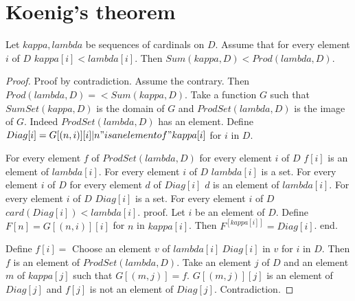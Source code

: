 \documentclass{article}
\begin{document}
  \section*{Koenig's theorem}

  \begin{forthel}
    \begin{theorem}[Koenig]
      Let $kappa, lambda$ be sequences of cardinals on $D$. Assume that for every element $i$ of $D$ $kappa[i] < lambda[i]$. Then $Sum(kappa,D) < Prod(lambda,D)$.
    \end{theorem}
    \begin{proof}
      Proof by contradiction. Assume the contrary. Then $Prod(lambda,D) =<
      Sum(kappa,D)$. Take a function $G$ such that $SumSet(kappa,D)$ is the domain of $G$ and $ProdSet(lambda,D)$ is the image of $G$. Indeed $ProdSet(lambda, D)$ has an element. Define $Diag[i] = {G[(n,i)][i] | n "is an element of" kappa[i]}$ for $i$ in $D$.

      For every element $f$ of $ProdSet(lambda, D)$ for every element $i$ of $D$ $f[i]$ is an element of $lambda[i]$.
      For every element $i$ of $D$ $lambda[i]$ is a set.
      For every element $i$ of $D$ for every element $d$ of $Diag[i]$ $d$ is an element of $lambda[i]$.
      For every element $i$ of $D$ $Diag[i]$ is a set.
      For every element $i$ of $D$ $card(Diag[i]) < lambda[i]$.
      proof.
        Let $i$ be an element of $D$. Define $F[n] = G[(n,i)][i]$ for $n$ in $kappa[i]$. Then $F^[kappa[i]] = Diag[i]$.
      end.

      Define $f[i] =$ Choose an element $v$ of $lambda[i] \ Diag[i]$ in $v$ for $i$ in $D$. Then $f$ is an element of $ProdSet(lambda,D)$. Take an element $j$ of $D$ and an element $m$ of $kappa[j]$ such that $G[(m,j)] = f$. $G[(m,j)][j]$ is an element of $Diag[j]$ and $f[j]$ is not an element of $Diag[j]$. Contradiction.
    \end{proof}
  \end{forthel}
\end{document}
